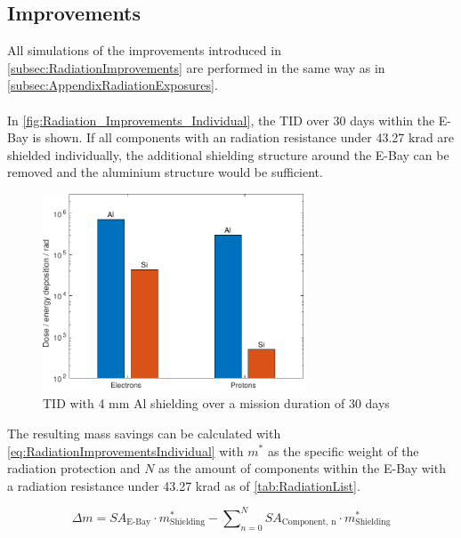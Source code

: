\newpage

\subsection{Improvements}

\label{subsec:AppendixRadiationImprovements}

All simulations of the improvements introduced in \autoref{subsec:RadiationImprovements} are performed in the same way as in \autoref{subsec:AppendixRadiationExposures}. \\ \\
In \autoref{fig:Radiation_Improvements_Individual}, the TID over 30 days within the E-Bay is shown. If all components with an radiation resistance under 43.27 krad are shielded individually, the additional shielding structure around the E-Bay can be removed and the aluminium structure would be sufficient.

\begin{figure}[htp]
	\centering
	\includegraphics[width=0.7\textwidth]{Media/J_Improvements_Individual}
	\caption{TID with 4 mm Al shielding over a mission duration of 30 days}
	\label{fig:Radiation_Improvements_Individual}
\end{figure}

The resulting mass savings can be calculated with \autoref{eq:RadiationImprovementsIndividual} with \(m^*\) as the specific weight of the radiation protection and \(N\) as the amount of components within the E-Bay with a radiation resistance under 43.27 krad as of \autoref{tab:RadiationList}.

\begin{equation}
	\Delta m = SA_\text{E-Bay} \cdot m^*_\text{Shielding} - \sum\nolimits_{n=0}^N SA_\text{Component, n} \cdot m^*_\text{Shielding}
	\label{eq:RadiationImprovementsIndividual}
\end{equation}

